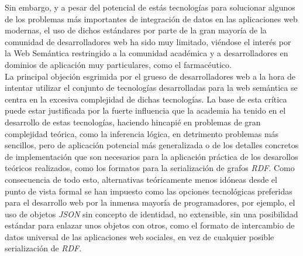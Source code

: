 Sin embargo, y a pesar del potencial de est\'as tecnolog\'ias para solucionar algunos de los problemas m\'as importantes de integraci\'on de datos en las aplicaciones web modernas, el uso de dichos est\'andares por parte de la gran mayor\'ia de la comunidad de desarrolladores web ha sido muy limitado, vi\'endose el inter\'es por la Web Sem\'antica restringido a la comunidad acad\'emica y a desarrolladores en dominios de aplicaci\'on muy particulares, como el farmac\'eutico.\\
La principal objeci\'on esgrimida por el grueso de desarrolladores web a la hora de intentar utilizar el conjunto de tecnolog\'ias desarrolladas para la web sem\'antica se centra en la excesiva complejidad de dichas tecnolog\'ias. La base de esta cr\'itica puede estar justificada por la fuerte influencia que la academia ha tenido en el desarrollo de estas tecnolog\'ias, haciendo hincapi\'e en problemas de gran complejidad te\'orica, como la inferencia l\'ogica, en detrimento problemas m\'as sencillos, pero de aplicaci\'on potencial m\'as generalizada o de los detalles concretos de implementaci\'on que son necesarios para la aplicaci\'on pr\'actica de los desarollos te\'oricos realizados, como los formatos para la serializaci\'on de grafos {\it RDF}. 
Como consecuencia de todo esto, alternativas te\'oricamente menos id\'oneas desde el punto de vista formal se han impuesto como las opciones tecnol\'ogicas preferidas para el desarrollo web por la inmensa mayor\'ia de programadores, por ejemplo, el uso de objetos {\it JSON} \cite{json} sin concepto de identidad, no extensible, sin una posibilidad est\'andar para enlazar unos objetos con otros, como el formato de intercambio de datos universal de las aplicaciones web sociales, en vez de cualquier posible serializaci\'on de {\it RDF}.\\

